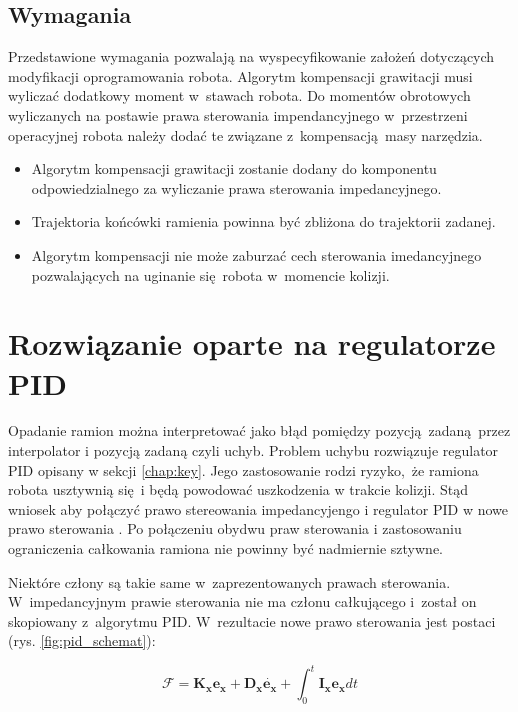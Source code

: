 \subsection{Wymagania}
Przedstawione wymagania pozwalają na wyspecyfikowanie założeń dotyczących modyfikacji oprogramowania robota. Algorytm kompensacji grawitacji musi wyliczać dodatkowy moment w~stawach robota. Do momentów obrotowych wyliczanych na postawie  prawa sterowania impendancyjnego w~przestrzeni operacyjnej robota należy dodać te związane z~kompensacją masy narzędzia.
\begin{itemize}
	\item Algorytm kompensacji grawitacji zostanie dodany do komponentu odpowiedzialnego za wyliczanie prawa sterowania impedancyjnego.
	\item Trajektoria końcówki ramienia powinna być zbliżona do trajektorii zadanej.
	\item Algorytm kompensacji nie może zaburzać cech sterowania imedancyjnego pozwalających na uginanie się robota w~momencie kolizji.
\end{itemize}



\section{Rozwiązanie oparte na regulatorze PID}
\label{chap:rozw_pid}
Opadanie ramion można interpretować jako błąd pomiędzy pozycją zadaną przez interpolator i pozycją zadaną czyli uchyb. Problem uchybu rozwiązuje regulator PID opisany w sekcji \ref{chap:key}. Jego zastosowanie rodzi ryzyko, że ramiona robota usztywnią się i będą powodować uszkodzenia w trakcie kolizji. Stąd wniosek aby połączyć prawo stereowania impedancyjengo i regulator PID w nowe prawo sterowania \cite{bib:gravity2, bib:rozw_pid1}. Po połączeniu obydwu praw sterowania i zastosowaniu ograniczenia całkowania ramiona nie powinny być nadmiernie sztywne. 

Niektóre człony są takie same w~zaprezentowanych prawach sterowania. W~impedancyjnym prawie sterowania nie ma członu całkującego i~został on skopiowany z~algorytmu PID. W~rezultacie nowe prawo sterowania jest postaci (rys. \ref{fig:pid_schemat}):

\begin{equation}
\boldsymbol{\mathcal{F}} = \boldsymbol{K_x}\boldsymbol{e_x} + \boldsymbol{D_x}\dot{\boldsymbol{e_x}} + \int_{0}^{t}  \boldsymbol{I_x}\boldsymbol{e_x}dt
\end{equation}

